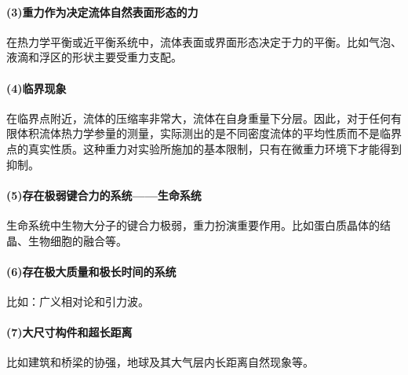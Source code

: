 \paragraph{(3)重力作为决定流体自然表面形态的力}在热力学平衡或近平衡系统中，流体表面或界面形态决定于力的平衡。比如气泡、液滴和浮区的形状主要受重力支配。
\paragraph{(4)临界现象}在临界点附近，流体的压缩率非常大，流体在自身重量下分层。因此，对于任何有限体积流体热力学参量的测量，实际测出的是不同密度流体的平均性质而不是临界点的真实性质。这种重力对实验所施加的基本限制，只有在微重力环境下才能得到抑制。
\paragraph{(5)存在极弱键合力的系统——生命系统}生命系统中生物大分子的键合力极弱，重力扮演重要作用。比如蛋白质晶体的结晶、生物细胞的融合等。
\paragraph{(6)存在极大质量和极长时间的系统}比如：广义相对论和引力波。
\paragraph{(7)大尺寸构件和超长距离}比如建筑和桥梁的协强，地球及其大气层内长距离自然现象等。

